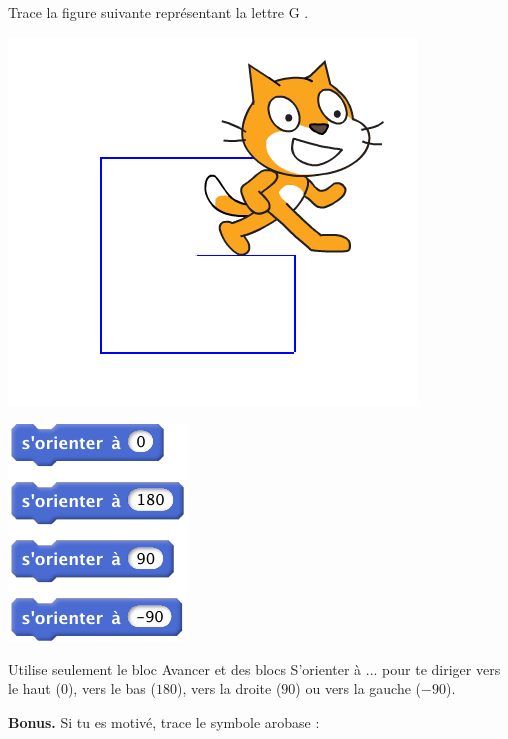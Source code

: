 \documentclass[class=report,crop=false, 12pt]{standalone}
\begin{document}
\begin{activite}

Trace la figure suivante représentant la lettre \og G \fg{}.

\begin{center}
\begin{minipage}{0.3\textwidth}
\includegraphics[width=\textwidth]{ecran-01-ex2}
\end{minipage}
\begin{minipage}{0.3\textwidth}
\end{minipage}
\begin{minipage}{0.3\textwidth}
\includegraphics[scale=\scalebloc]{bloc-01-ex2}
\end{minipage}
\end{center}

Utilise seulement le bloc \og Avancer \fg{} et des blocs \og S'orienter à ... \fg{} pour te diriger vers le haut ($0$\textdegree), vers le bas ($180$\textdegree), vers la droite ($90$\textdegree) ou vers la gauche ($-90$\textdegree).

\bigskip

\textbf{Bonus.} 
Si tu es motivé, trace le symbole \og arobase \fg{}  \at :
 
\end{activite}
\end{document}
